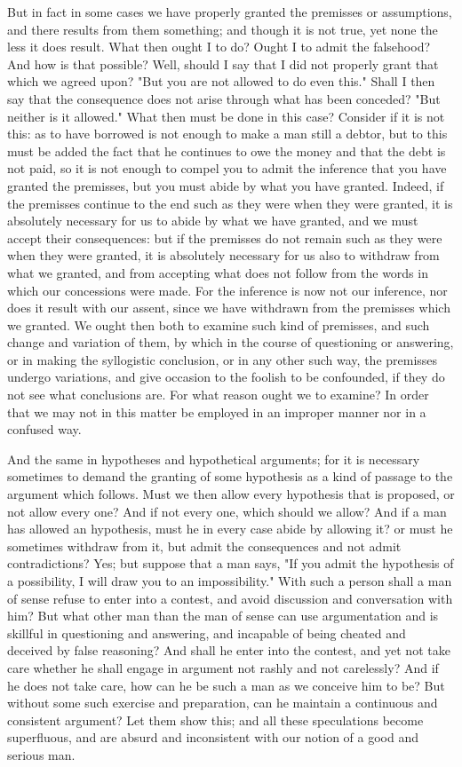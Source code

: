 \documentclass[a4paper]{article}
\begin{document}
But in fact in some cases we have properly granted the premisses or
assumptions, and there results from them something; and though it
is not true, yet none the less it does result. What then ought I to
do? Ought I to admit the falsehood? And how is that possible? Well,
should I say that I did not properly grant that which we agreed upon?
"But you are not allowed to do even this." Shall I then say that the
consequence does not arise through what has been conceded? "But neither
is it allowed." What then must be done in this case? Consider if it
is not this: as to have borrowed is not enough to make a man still
a debtor, but to this must be added the fact that he continues to
owe the money and that the debt is not paid, so it is not enough to
compel you to admit the inference that you have granted the premisses,
but you must abide by what you have granted. Indeed, if the premisses
continue to the end such as they were when they were granted, it is
absolutely necessary for us to abide by what we have granted, and
we must accept their consequences: but if the premisses do not remain
such as they were when they were granted, it is absolutely necessary
for us also to withdraw from what we granted, and from accepting what
does not follow from the words in which our concessions were made.
For the inference is now not our inference, nor does it result with
our assent, since we have withdrawn from the premisses which we granted.
We ought then both to examine such kind of premisses, and such change
and variation of them, by which in the course of questioning or answering,
or in making the syllogistic conclusion, or in any other such way,
the premisses undergo variations, and give occasion to the foolish
to be confounded, if they do not see what conclusions are. For what
reason ought we to examine? In order that we may not in this matter
be employed in an improper manner nor in a confused way.

And the same in hypotheses and hypothetical arguments; for it is necessary
sometimes to demand the granting of some hypothesis as a kind of passage
to the argument which follows. Must we then allow every hypothesis
that is proposed, or not allow every one? And if not every one, which
should we allow? And if a man has allowed an hypothesis, must he in
every case abide by allowing it? or must he sometimes withdraw from
it, but admit the consequences and not admit contradictions? Yes;
but suppose that a man says, "If you admit the hypothesis of a possibility,
I will draw you to an impossibility." With such a person shall a man
of sense refuse to enter into a contest, and avoid discussion and
conversation with him? But what other man than the man of sense can
use argumentation and is skillful in questioning and answering, and
incapable of being cheated and deceived by false reasoning? And shall
he enter into the contest, and yet not take care whether he shall
engage in argument not rashly and not carelessly? And if he does not
take care, how can he be such a man as we conceive him to be? But
without some such exercise and preparation, can he maintain a continuous
and consistent argument? Let them show this; and all these speculations
become superfluous, and are absurd and inconsistent with our notion
of a good and serious man. 
\end{document}
